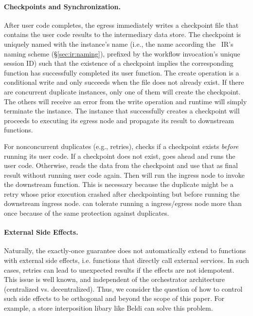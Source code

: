 \paragraph{Checkpoints and Synchronization.}%
After user code completes, the \name{} egress immediately writes a checkpoint
file that contains the user code results to the intermediary data store. The
checkpoint is uniquely named with the instance's name (i.e., the name
according the
\name{}~IR's naming scheme (\S\ref{sec:ir:naming}), prefixed by the workflow
invocation's unique session ID) such that the existence of a checkpoint
implies the corresponding function has successfully completed its user
function. The create operation is a conditional write and only succeeds when
the file does not already exist. If there are concurrent duplicate instances,
only one of them will create the checkpoint. The others will receive an error
from the write operation and \name{} runtime will simply terminate the
instance. The instance that successfully creates a checkpoint will proceeds to
executing its egress node and propagate its result to downstream functions.

For nonconcurrent duplicates (e.g., retries), \name{} checks if a checkpoint
exists \emph{before} running its user code. If a checkpoint does not exist,
\name{} goes ahead and runs the user code. Otherwise, \name{} reads the data
from the checkpoint and use that as final result without running user code
again. Then \name{} will run the ingress node to invoke the downstream function.
This is necessary because the duplicate might be a retry whose prior execution
crashed after checkpointing but before running the downstream ingress node. \name{} can
tolerate running a ingress/egress node more than once because of the same protection
against duplicates.

\paragraph{External Side Effects.} Naturally, the
exactly-once guarantee does not automatically extend to functions with
external side effects, i.e. functions that directly call external services. In
such cases, retries can lead to unexpected results if the effects are not
idempotent. This issue is well known, and independent of the orchestrator
architecture (centralized vs. decentralized). Thus, we consider the question
of how to control such side effects to be orthogonal and beyond the scope of
this paper. For example, a store interposition libary like Beldi \cite{beldi}
can solve this problem.
